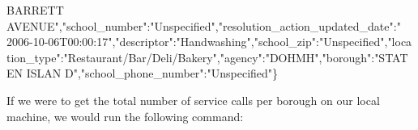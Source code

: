 \documentclass[
]{book}
\newenvironment{Shaded}{\begin{snugshade}}{\end{snugshade}}
\newcommand{\ExtensionTok}[1]{#1}
\newcommand{\FunctionTok}[1]{\textcolor[rgb]{0.00,0.00,0.00}{#1}}
\newcommand{\KeywordTok}[1]{\textcolor[rgb]{0.13,0.29,0.53}{\textbf{#1}}}
\newcommand{\NormalTok}[1]{#1}
\newcommand{\OperatorTok}[1]{\textcolor[rgb]{0.81,0.36,0.00}{\textbf{#1}}}
\newcommand{\StringTok}[1]{\textcolor[rgb]{0.31,0.60,0.02}{#1}}
\theoremstyle{definition}
\theoremstyle{definition}
\theoremstyle{definition}
\theoremstyle{remark}
\begin{document}
\begin{Shaded}
\begin{Highlighting}[]
\StringTok{BARRETT AVENUE"}\NormalTok{,}\StringTok{"school_number"}\NormalTok{:}\StringTok{"Unspecified"}\NormalTok{,}\StringTok{"resolution_action_updated_date"}\NormalTok{:}\StringTok{"}
\StringTok{2006-10-06T00:00:17"}\NormalTok{,}\StringTok{"descriptor"}\NormalTok{:}\StringTok{"Handwashing"}\NormalTok{,}\StringTok{"school_zip"}\NormalTok{:}\StringTok{"Unspecified"}\NormalTok{,}\StringTok{"loca}
\StringTok{tion_type"}\NormalTok{:}\StringTok{"Restaurant/Bar/Deli/Bakery"}\NormalTok{,}\StringTok{"agency"}\NormalTok{:}\StringTok{"DOHMH"}\NormalTok{,}\StringTok{"borough"}\NormalTok{:}\StringTok{"STATEN ISLAN}
\StringTok{D"}\NormalTok{,}\StringTok{"school_phone_number"}\NormalTok{:}\StringTok{"Unspecified"}\NormalTok{\}}
\end{Highlighting}
\end{Shaded}

If we were to get the total number of service calls per borough on our local machine, we would run the following command:

\begin{Shaded}
\end{Shaded}
\end{document}
